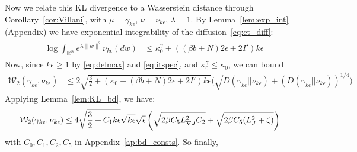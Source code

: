 \documentclass[journal,onecolumn]{IEEEtran}
\newcommand{\step}{\epsilon}
\newcommand{\grad}{\nabla}
\newcommand{\rew}{J}
\newcommand{\reals}{\mathbb{R}}
\newcommand{\dimn}{N}
\newcommand{\kn}{\kappa_0}
\newcommand{\knw}{\kn^{\idw}}
\newcommand{\wass}{\mathcal{W}_2}
\newcommand{\KL}{D}
\newcommand{\dtlaw}{\ids_{k}} %
\newcommand{\ctlaw}{\nu_{k\step}}
\newcommand{\sgdstep}{\eta}
\newcommand{\ids}{\pi}
\newcommand{\idw}{\gamma}
\newcommand{\ksp}{k,\idw}
\newcommand{\idiffcc}{I'}
\newcommand{\dissb}{b}
\newcommand{\gradnvar}{\zeta}
\newcommand{\ytlaw}{\gamma_{k\step}}
\newcommand{\lipJ}{L_J}
\newcommand{\lipGJ}{L_{\grad\rew}}
\begin{document}
{Now we relate this KL divergence to a Wasserstein distance through Corollary~\ref{cor:Villani}, with $\mu = \ytlaw, \,\nu = \ctlaw, \,\lambda = 1$.
By Lemma~\ref{lem:exp_int} (Appendix) we have exponential integrability of the diffusion~\eqref{eq:ct_diff}:
\begin{align*}
    \begin{split}
        \log \int_{\reals^{\dimn}}e^{\lambda\|w\|^2}\ctlaw(dw) &\leq\knw + ((\beta \dissb + \dimn)2\step + 2 \idiffcc) k\step
    \end{split}
\end{align*}
Now, since $k\step \geq 1$ by \eqref{eq:delmax} and \eqref{eq:itspec}, and $\knw \leq \kn$, we can bound 
\begin{align*}
    \wass (\ytlaw,\ctlaw) &\leq 2\sqrt{\frac{3}{2} + (\kn + (\beta \dissb + \dimn)2\step + 2 \idiffcc)k \step }\biggl(\sqrt{\KL(\ytlaw || \ctlaw)} + \left(\KL(\ytlaw || \ctlaw)\right)^{1/4}\biggr)
\end{align*}
Applying Lemma~\ref{lem:KL_bd}, we have:
\begin{align*}
    \wass (\ytlaw,\ctlaw)
    & \leq {\color{black} 4\sqrt{\frac{3}{2} + C_1 k \step }\sqrt{k\step}\sqrt{\step}\left(\sqrt{2\beta C_5 \lipGJ^2 C_2 } + \sqrt{2\beta C_5 (\lipJ^2 + \gradnvar)} \right)}
\end{align*}
with $C_0, C_1, C_2, C_5$ in Appendix~\ref{ap:bd_consts}. So finally,
}
\end{document}
